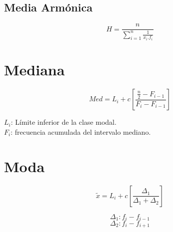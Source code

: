 \subsection{Media Armónica}
\begin{equation*}
H=\frac { n }{ \sum _{ i=1 }^{ n }{ \frac { 1 }{ x_{ i }.{ f }_{ i } }  }  }
\end{equation*}


\section{Mediana}
\begin{minipage}[t]{0.5\textwidth}
	\begin{equation*}
Med={ L }_{ i }+c\left[ \frac { \frac { n }{ 2 } -{ F }_{ i-1 } }{ { F }_{ i }-{ F }_{ i-1 } }  \right] 
	\end{equation*}
 \end{minipage} \hfill \begin{minipage}[t]{0.5\textwidth}
 ${L}_{i}$: Límite inferior de la clase modal. \\
 ${F}_{i}$: frecuencia acumulada del intervalo mediano.
 \end{minipage}
 
\section{Moda}
\begin{minipage}[t]{0.5\textwidth}
	\begin{equation*}
\tilde { x } ={ L }_{ i }+c\left[ \frac { { \Delta  }_{ 1 } }{ { \Delta  }_{ 1 }+{ \Delta  }_{ 2 } }  \right] 
 \end{equation*}
 \end{minipage} \hfill \begin{minipage}[t]{0.5\textwidth}
	\begin{equation*}
{ \Delta  }_{ 1 }: f_{ i }-f_{ i-1 }
	\end{equation*}
	\begin{equation*}
{ \Delta  }_{ 2 }: f_{ i }-f_{ i+1 }
	\end{equation*}


\end{minipage}